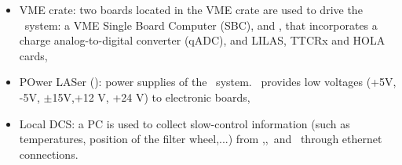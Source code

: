 \begin{itemize}
\item VME crate: two boards located in the VME crate are used to drive the \lasii~system: a VME Single Board Computer (SBC), and \lascar, that incorporates a charge analog-to-digital converter (qADC), and LILAS, TTCRx and HOLA cards,

\item POwer LASer (\polas): power supplies of the \lasii~system. \polas~provides low voltages (+5V, -5V, $\pm$15V,+12 V, +24 V) to electronic boards,

\item Local DCS: a PC is used to collect slow-control information (such as temperatures, position of the filter wheel,...) from \licmot,\licpmt,\licphd~and \lascar~through ethernet connections.


\end{itemize}